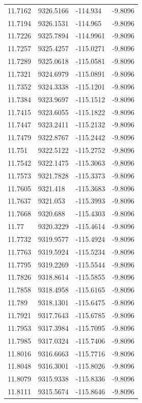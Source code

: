 \begin{table}[H]
\begin{tabular}{llll}
11.7162 & 9326.5166 & -114.934 & -9.8096 \\
11.7194 & 9326.1531 & -114.965 & -9.8096 \\
11.7226 & 9325.7894 & -114.9961 & -9.8096 \\
11.7257 & 9325.4257 & -115.0271 & -9.8096 \\
11.7289 & 9325.0618 & -115.0581 & -9.8096 \\
11.7321 & 9324.6979 & -115.0891 & -9.8096 \\
11.7352 & 9324.3338 & -115.1201 & -9.8096 \\
11.7384 & 9323.9697 & -115.1512 & -9.8096 \\
11.7415 & 9323.6055 & -115.1822 & -9.8096 \\
11.7447 & 9323.2411 & -115.2132 & -9.8096 \\
11.7479 & 9322.8767 & -115.2442 & -9.8096 \\
11.751 & 9322.5122 & -115.2752 & -9.8096 \\
11.7542 & 9322.1475 & -115.3063 & -9.8096 \\
11.7573 & 9321.7828 & -115.3373 & -9.8096 \\
11.7605 & 9321.418 & -115.3683 & -9.8096 \\
11.7637 & 9321.053 & -115.3993 & -9.8096 \\
11.7668 & 9320.688 & -115.4303 & -9.8096 \\
11.77 & 9320.3229 & -115.4614 & -9.8096 \\
11.7732 & 9319.9577 & -115.4924 & -9.8096 \\
11.7763 & 9319.5924 & -115.5234 & -9.8096 \\
11.7795 & 9319.2269 & -115.5544 & -9.8096 \\
11.7826 & 9318.8614 & -115.5855 & -9.8096 \\
11.7858 & 9318.4958 & -115.6165 & -9.8096 \\
11.789 & 9318.1301 & -115.6475 & -9.8096 \\
11.7921 & 9317.7643 & -115.6785 & -9.8096 \\
11.7953 & 9317.3984 & -115.7095 & -9.8096 \\
11.7985 & 9317.0324 & -115.7406 & -9.8096 \\
11.8016 & 9316.6663 & -115.7716 & -9.8096 \\
11.8048 & 9316.3001 & -115.8026 & -9.8096 \\
11.8079 & 9315.9338 & -115.8336 & -9.8096 \\
11.8111 & 9315.5674 & -115.8646 & -9.8096 \\

\end{tabular}
\end{table}
